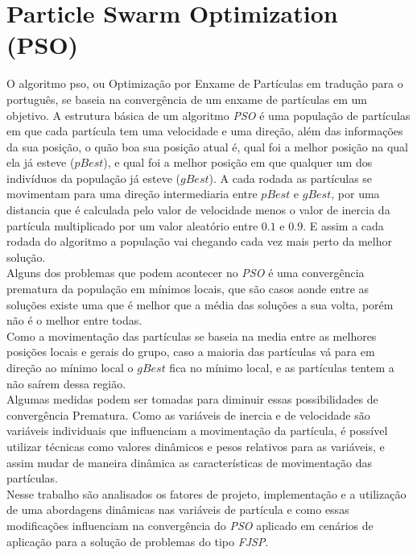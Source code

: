 \section{Particle Swarm Optimization (PSO)}
\indent O algoritmo \gls{pso}, ou Optimização por Enxame de Partículas em tradução para o português, se baseia na convergência de um enxame de partículas em um objetivo.
A estrutura básica de um algoritmo \textit{PSO} é uma população de partículas em que cada partícula tem uma velocidade e uma direção, além das informações da sua posição, o quão boa sua posição atual é, qual foi a melhor posição na qual ela já esteve ($pBest$), e qual foi a melhor posição em que qualquer um dos indivíduos da população já esteve ($gBest$).
A cada rodada as partículas se movimentam para uma direção intermediaria entre $pBest$ e $gBest$, por uma distancia que é calculada pelo valor de velocidade menos o valor de inercia da partícula multiplicado por um valor aleatório entre $0.1$ e $0.9$. 
E assim a cada rodada do algoritmo a população vai chegando cada vez mais perto da melhor solução.\\
\indent Alguns dos problemas que podem acontecer no \textit{PSO} é uma convergência prematura da população em mínimos locais,
que são casos aonde entre as soluções existe uma que é melhor que a média das soluções a sua volta, porém não é o melhor entre todas.\\
Como a movimentação das partículas se baseia na media entre as melhores posições locais e gerais do grupo, caso a maioria das partículas vá para em direção ao mínimo local o $gBest$ fica no mínimo local, e as partículas tentem a não saírem dessa região.\\
\indent Algumas medidas podem ser tomadas para diminuir essas possibilidades de convergência Prematura.
Como as variáveis de inercia e de velocidade são variáveis individuais que influenciam a movimentação da partícula, é possível utilizar técnicas como valores dinâmicos e pesos relativos para as variáveis, e assim mudar de maneira dinâmica as características de movimentação das partículas.\\
\indent Nesse trabalho são analisados os fatores de projeto, implementação e a utilização de uma abordagens dinâmicas nas variáveis de partícula e como essas modificações influenciam na convergência do \textit{PSO} aplicado em cenários de aplicação para a solução de problemas do tipo \textit{FJSP}.



